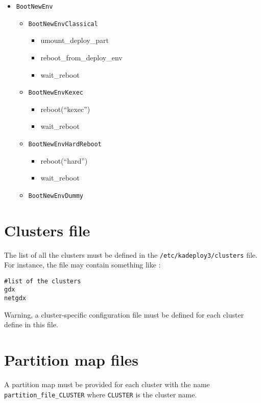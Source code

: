 \documentclass[a4wide,10pt,oneside]{book}
\begin{document}
\begin{itemize}
\begin{itemize}
\begin{itemize}
    \end{itemize}
  \item \texttt{BootNewEnv}
    \begin{itemize}
      \item \texttt{BootNewEnvClassical}
        \begin{itemize}
        \item umount\_deploy\_part
        \item reboot\_from\_deploy\_env
        \item wait\_reboot
        \end{itemize}
      \item \texttt{BootNewEnvKexec}
        \begin{itemize}
        \item reboot(``kexec'')
        \item wait\_reboot
        \end{itemize}
      \item \texttt{BootNewEnvHardReboot}
        \begin{itemize}
        \item reboot(``hard'')
        \item wait\_reboot
        \end{itemize}
      \item \texttt{BootNewEnvDummy}
    \end{itemize}
  \end{itemize}
\end{itemize}

\section{Clusters file}
The list of all the clusters must be defined in the  \texttt{/etc/kadeploy3/clusters} file. For instance, the file may contain something like :
\begin{small}
\begin{verbatim}
#list of the clusters
gdx
netgdx
\end{verbatim}
\end{small}
Warning, a cluster-specific configuration file must be defined for each cluster define in this file.

\section{Partition map files}
A partition map must be provided for each cluster with the name \texttt{partition\_file\_CLUSTER} where \texttt{CLUSTER} is the cluster name. 
\end{document}
